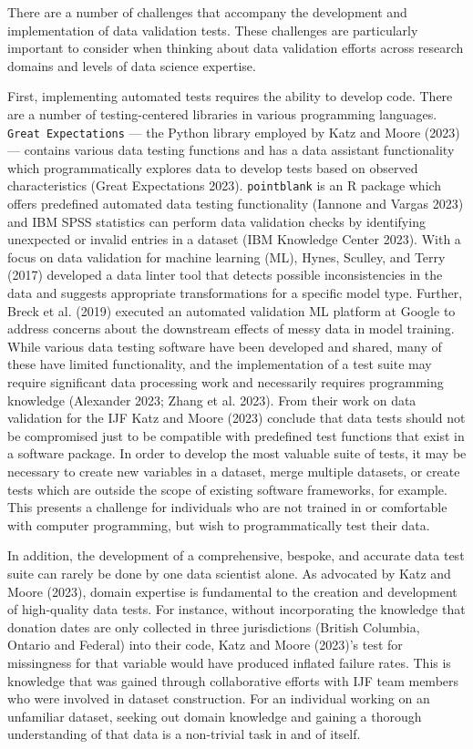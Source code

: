 \documentclass[
  letterpaper,
  DIV=11,
  numbers=noendperiod]{scrartcl}
\begin{document}
There are a number of challenges that accompany the development and
implementation of data validation tests. These challenges are
particularly important to consider when thinking about data validation
efforts across research domains and levels of data science expertise.

First, implementing automated tests requires the ability to develop
code. There are a number of testing-centered libraries in various
programming languages. \texttt{Great\ Expectations} --- the Python
library employed by Katz and Moore (2023) --- contains various data
testing functions and has a data assistant functionality which
programmatically explores data to develop tests based on observed
characteristics (Great Expectations 2023). \texttt{pointblank} is an R
package which offers predefined automated data testing functionality
(Iannone and Vargas 2023) and IBM SPSS statistics can perform data
validation checks by identifying unexpected or invalid entries in a
dataset (IBM Knowledge Center 2023). With a focus on data validation for
machine learning (ML), Hynes, Sculley, and Terry (2017) developed a data
linter tool that detects possible inconsistencies in the data and
suggests appropriate transformations for a specific model type. Further,
Breck et al. (2019) executed an automated validation ML platform at
Google to address concerns about the downstream effects of messy data in
model training. While various data testing software have been developed
and shared, many of these have limited functionality, and the
implementation of a test suite may require significant data processing
work and necessarily requires programming knowledge (Alexander 2023;
Zhang et al. 2023). From their work on data validation for the IJF Katz
and Moore (2023) conclude that data tests should not be compromised just
to be compatible with predefined test functions that exist in a software
package. In order to develop the most valuable suite of tests, it may be
necessary to create new variables in a dataset, merge multiple datasets,
or create tests which are outside the scope of existing software
frameworks, for example. This presents a challenge for individuals who
are not trained in or comfortable with computer programming, but wish to
programmatically test their data.

In addition, the development of a comprehensive, bespoke, and accurate
data test suite can rarely be done by one data scientist alone. As
advocated by Katz and Moore (2023), domain expertise is fundamental to
the creation and development of high-quality data tests. For instance,
without incorporating the knowledge that donation dates are only
collected in three jurisdictions (British Columbia, Ontario and Federal)
into their code, Katz and Moore (2023)'s test for missingness for that
variable would have produced inflated failure rates. This is knowledge
that was gained through collaborative efforts with IJF team members who
were involved in dataset construction. For an individual working on an
unfamiliar dataset, seeking out domain knowledge and gaining a thorough
understanding of that data is a non-trivial task in and of itself.
\end{document}
